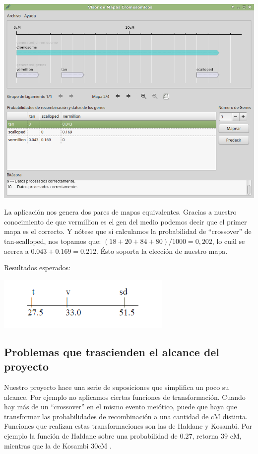 \documentclass{article}
\begin{document}
	\begin{center}
		\includegraphics[scale=0.5]{images/e_7.png}
	\end{center}
	
	La aplicación nos genera dos pares de mapas equivalentes. Gracias a nuestro conocimiento de que vermillion es el gen del medio podemos decir que el primer mapa es el correcto. Y nótese que si calculamos la probabilidad de ``crossover'' de tan-scalloped, nos topamos que: $(18 + 20 + 84 + 80) / 1000 =  0,202$, lo cuál se acerca a $0.043 + 0.169 = 0.212$. Ésto soporta la elección de nuestro mapa.
	
	Resultados esperados:
	
	\begin{center}
		\includegraphics[scale=1]{images/e_8.png}
	\end{center}
	
	\subsection{Problemas que trascienden el alcance del proyecto}
	
	Nuestro proyecto hace una serie de suposiciones que simplifica un poco su alcance. Por ejemplo no aplicamos ciertas funciones de transformación. Cuando hay más de un ``crossover'' en el mismo evento meiótico, puede que haya que transformar las probabilidades de recombinación a una cantidad de cM distinta. Funciones que realizan estas transformaciones son las de Haldane y Kosambi. Por ejemplo la función de Haldane sobre una probabilidad de $0.27$, retorna 39 cM, mientras que la de Kosambi 30cM \cite{terwilliger1994handbook}.
	
\end{document}
